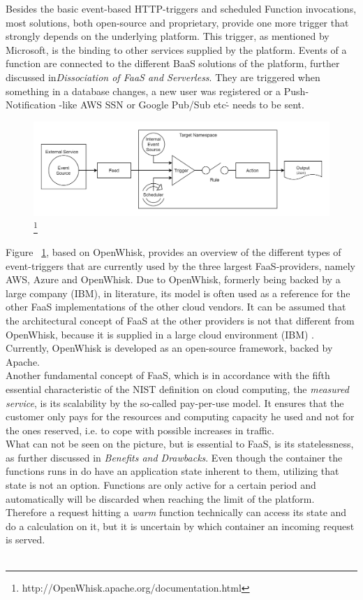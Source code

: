 \documentclass[11pt]{article}
\begin{document}
Besides the basic event-based HTTP-triggers and scheduled Function invocations, most solutions, both open-source and proprietary, provide one more trigger that strongly depends on the underlying platform. This trigger, as mentioned by Microsoft, is the binding to other services supplied by the platform. Events of a function are connected to the different BaaS solutions of the platform, further discussed in\textit{Dissociation of FaaS and Serverless}. They are triggered when something in a database changes, a new user was registered or a Push-Notification -like AWS SSN or Google Pub/Sub etc\.- needs to be sent.\\
\begin{figure}[H]
\caption[FaaS Programming Model nach OpenWhisk]{\footnote{http://OpenWhisk.apache.org/documentation.html}}
\label{fig:OpenWhiskProgrammingModel}
\centering
\includegraphics[width=1\textwidth]{ProgrammingModel}
\end{figure}
Figure ~\ref{fig:OpenWhiskProgrammingModel}, based on OpenWhisk, provides an overview of the different types of event-triggers that are currently used by the three largest FaaS-providers, namely AWS, Azure and OpenWhisk. Due to OpenWhisk, formerly being backed by a large company (IBM), in literature, its model is often used as a reference for the other FaaS implementations of the other cloud vendors. It can be assumed that the architectural concept of FaaS at the other providers is not that different from OpenWhisk, because it is supplied in a large cloud environment (IBM) \cite{van2019spec}. Currently, OpenWhisk is developed as an open-source framework, backed by Apache. \\ Another fundamental concept of FaaS, which is in accordance with the fifth essential characteristic of the NIST definition on cloud computing, the \textit{measured service}, is its scalability by the so-called pay-per-use model. It ensures that the customer only pays for the resources and computing capacity he used and not for the ones reserved, i.e. to cope with possible increases in traffic.\\ What can not be seen on the picture, but is essential to FaaS, is its statelessness, as further discussed in \textit{Benefits and Drawbacks}. Even though the container the functions runs in do have an application state inherent to them, utilizing that state is not an option. Functions are only active for a certain period and automatically will be discarded when reaching the limit of the platform. Therefore a request hitting a \textit{warm} function technically can access its state and do a calculation on it, but it is uncertain by which container an incoming request is served. \\\\
\end{document}
